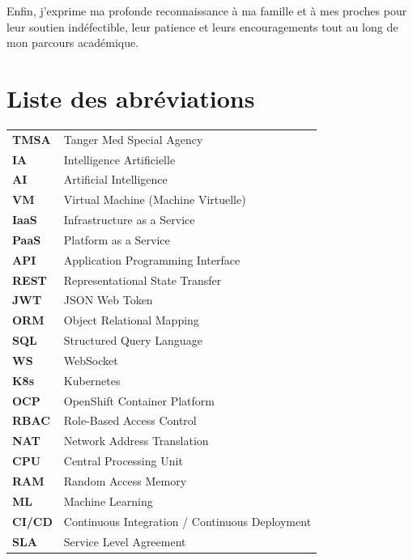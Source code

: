 \documentclass[11pt,a4paper]{report}
\begin{document}
Enfin, j'exprime ma profonde reconnaissance à ma famille et à mes proches pour
leur soutien indéfectible, leur patience et leurs encouragements tout au long
de mon parcours académique.

\vfill

\chapter*{Liste des abréviations}

\normalsize
\setlength{\parskip}{0.8em}

\begin{center}
\renewcommand{\arraystretch}{1.4}
\begin{tabular}{p{3cm} p{11cm}}
\textbf{TMSA} & Tanger Med Special Agency \\
\textbf{IA} & Intelligence Artificielle \\
\textbf{AI} & Artificial Intelligence \\
\textbf{VM} & Virtual Machine (Machine Virtuelle) \\
\textbf{IaaS} & Infrastructure as a Service \\
\textbf{PaaS} & Platform as a Service \\
\textbf{API} & Application Programming Interface \\
\textbf{REST} & Representational State Transfer \\
\textbf{JWT} & JSON Web Token \\
\textbf{ORM} & Object Relational Mapping \\
\textbf{SQL} & Structured Query Language \\
\textbf{WS} & WebSocket \\
\textbf{K8s} & Kubernetes \\
\textbf{OCP} & OpenShift Container Platform \\
\textbf{RBAC} & Role-Based Access Control \\
\textbf{NAT} & Network Address Translation \\
\textbf{CPU} & Central Processing Unit \\
\textbf{RAM} & Random Access Memory \\
\textbf{ML} & Machine Learning \\
\textbf{CI/CD} & Continuous Integration / Continuous Deployment \\
\textbf{SLA} & Service Level Agreement \\

\end{tabular}
\end{center}
\end{document}
